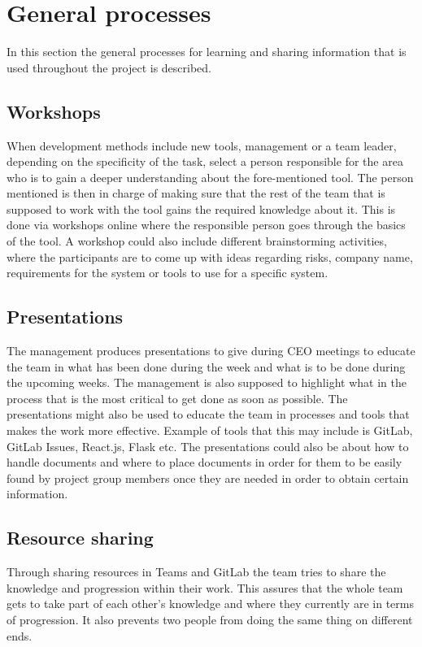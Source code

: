

\section{General processes}
In this section the general processes for learning and sharing information that is used throughout the project is described.
    \subsection{Workshops}
  When development methods include new tools, management or a team leader, depending on the specificity of the task, select a person responsible for the area who is to gain a deeper understanding about the fore-mentioned tool. The person mentioned is then in charge of making sure that the rest of the team that is supposed to work with the tool gains the required knowledge about it. This is done via workshops online where the responsible person goes through the basics of the tool.  A workshop could also include different brainstorming activities, where the participants are to come up with ideas regarding risks, company name, requirements for the system or tools to use for a specific system.
  
    \subsection{Presentations}
The management produces presentations to give during CEO meetings to educate the team in what has been done during the week and what is to be done during the upcoming weeks. The management is also supposed to highlight what in the process that is the most critical to get done as soon as possible. The presentations might also be used to educate the team in processes and tools that makes the work more effective. Example of tools that this may include is GitLab, GitLab Issues, React.js, Flask etc. The presentations could also be about how to handle documents and where to place documents in order for them to be easily found by project group members once they are needed in order to obtain certain information. 

    \subsection{Resource sharing}
 Through sharing resources in Teams and GitLab the team tries to share the knowledge and progression within their work. This assures that the whole team gets to take part of each other’s knowledge and where they currently are in terms of progression. It also prevents two people from doing the same thing on different ends. 
 
